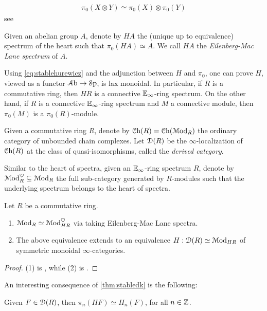 \documentclass[10pt]{amsart}
\begin{document}
\begin{align}\label{eq:stablehurewicz}
  \pi_0(X\otimes Y)\simeq\pi_0(X)\otimes\pi_0(Y)
\end{align}
see \cite[Theorem 2.3.28]{davies2024atii}

\begin{definition}Given an abelian group $A$, denote by $HA$ the (unique up to equivalence) spectrum of the heart such that $\pi_0(HA)\simeq A$. We call $HA$ the \emph{Eilenberg-Mac Lane spectrum} of $A$.
\end{definition}
Using \cref{eq:stablehurewicz} and the adjunction between $H$ and $\pi_0$, one can prove $H$, viewed as a functor $\mathcal{A}\mathrm{b}\to\mathcal{S}\mathrm{p}$, is lax monoidal. In particular, if $R$ is a commutative ring, then $HR$ is a connective $\mathbb{E}_\infty$-ring spectrum. On the other hand, if $R$ is a connective $\mathbb{E}_\infty$-ring spectrum and $M$ a connective module, then $\pi_0(M)$ is a $\pi_0(R)$-module. 
\begin{definition}
  Given a commutative ring $R$, denote by $\mathcal{C}\mathrm{h}(R)=\mathcal{C}\mathrm{h}(\mathcal{M}\mathrm{od}_{R})$ the ordinary category of unbounded chain complexes. Let $\mathcal{D}(R)$ be the $\infty$-localization of $\mathcal{C}\mathrm{h}(R)$ at the class of quasi-isomorphisms, called the \emph{derived category}.  
\end{definition} 
Similar to the heart of spectra, given an $\mathbb{E}_\infty$-ring spectrum $R$, denote by $\mathcal{M}\mathrm{od}_{R}^\heartsuit\subseteq \mathcal{M}\mathrm{od}_{R}$ the full sub-category generated by $R$-modules such that the underlying spectrum belongs to the heart of spectra. 
\begin{theorem}\label{thm:stabledk}
  Let $R$ be a commutative ring. 
  \begin{enumerate}
    \item $\mathcal{M}\mathrm{od}_{R}\simeq \mathcal{M}\mathrm{od}_{HR}^\heartsuit$ via taking Eilenberg-Mac Lane spectra.
    \item The above equivalence extends to an equivalence $H:\mathcal{D}(R)\simeq \mathcal{M}\mathrm{od}_{HR}$ of symmetric monoidal $\infty$-categories.
  \end{enumerate} 
\end{theorem}
\begin{proof}
  (1) is \cite[Proposition 7.1.1.13]{lurie2017ha}, while (2) is \cite[Theorem 7.1.2.13]{lurie2017ha}.
\end{proof}
An interesting consequence of \cref{thm:stabledk} is the following:
\begin{corollary}\label{cor:homotopyvshomology}
  Given $F\in\mathcal{D}(R)$, then $\pi_n(HF)\simeq H_n(F)$, for all $n\in\mathbb{Z}$.
\end{corollary}
\end{document}

